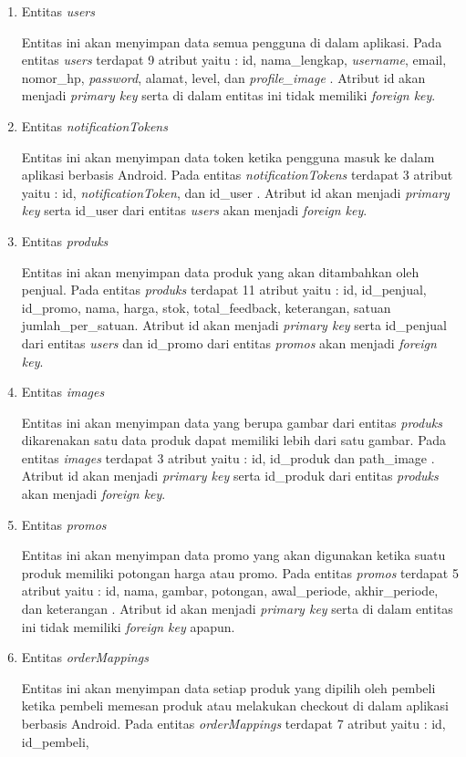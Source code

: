 \begin{enumerate}
	\item Entitas \textit{users}
	\par Entitas ini akan menyimpan data semua pengguna di dalam aplikasi. Pada entitas \textit{users} terdapat 9 atribut yaitu : id, nama\_lengkap, \textit{username}, email, nomor\_hp, \textit{password}, alamat, level, dan \textit{profile\_image} . Atribut id akan menjadi \textit{primary key} serta di dalam entitas ini tidak memiliki \textit{foreign key}.
	\item Entitas \textit{notificationTokens}
	\par Entitas ini akan menyimpan data token ketika pengguna masuk ke dalam aplikasi berbasis Android. Pada entitas \textit{notificationTokens} terdapat 3 atribut yaitu : id, \textit{notificationToken}, dan id\_user . Atribut id akan menjadi \textit{primary key} serta id\_user dari entitas \textit{users} akan menjadi \textit{foreign key}.
	\item Entitas \textit{produks}
	\par Entitas ini akan menyimpan data produk yang akan ditambahkan oleh penjual. Pada entitas \textit{produks} terdapat 11 atribut yaitu : id, id\_penjual, id\_promo, nama, harga, stok, total\_feedback, keterangan, satuan jumlah\_per\_satuan. Atribut id akan menjadi \textit{primary key} serta id\_penjual dari entitas \textit{users} dan id\_promo dari entitas \textit{promos} akan menjadi \textit{foreign key}.
	\item Entitas \textit{images}
	\par Entitas ini akan menyimpan data yang berupa gambar dari entitas \textit{produks} dikarenakan satu data produk dapat memiliki lebih dari satu gambar. Pada entitas \textit{images} terdapat 3 atribut yaitu : id, id\_produk dan path\_image . Atribut id akan menjadi \textit{primary key} serta id\_produk dari entitas \textit{produks} akan menjadi \textit{foreign key}.
	\item Entitas \textit{promos}
	\par Entitas ini akan menyimpan data promo yang akan digunakan ketika suatu produk memiliki potongan harga atau promo. Pada entitas \textit{promos} terdapat 5 atribut yaitu : id, nama, gambar, potongan, awal\_periode, akhir\_periode, dan keterangan . Atribut id akan menjadi \textit{primary key} serta di dalam entitas ini tidak memiliki \textit{foreign key} apapun.
	\newpage
	\item Entitas \textit{orderMappings}
	\par Entitas ini akan menyimpan data setiap produk yang dipilih oleh pembeli ketika pembeli memesan produk atau melakukan checkout di dalam aplikasi berbasis Android. Pada entitas \textit{orderMappings} terdapat 7 atribut yaitu : id, id\_pembeli,

\end{enumerate}

